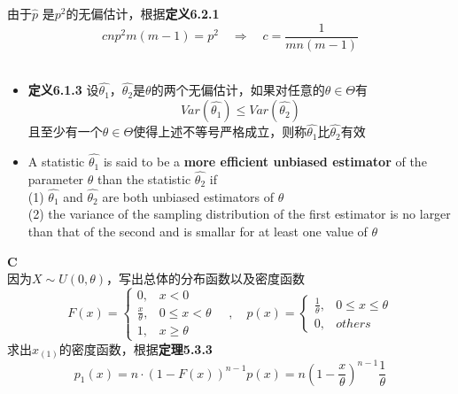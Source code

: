 \documentclass[a4paper]{ctexart}    %
\begin{document}
	由于$ \hat{p} $ 是$ p^2 $的无偏估计，根据\textbf{定义6.2.1}
	\begin{equation*}
		cnp^2m(m-1) = p^2 \quad \Rightarrow \quad c = \frac{1}{mn(m-1)}
	\end{equation*} \\
	\begin{tcolorbox}
		[
		colframe=blue!25,
		colback=blue!10,
		coltitle=blue!20!black,  
		fonttitle=\bfseries,
		adjusted title=Formula Or Theorem:
		]
		\begin{itemize}
			\item \textbf{定义6.1.3} 设$ \hat{\theta_1} $，$ \hat{\theta_2} $是$ \theta $的两个无偏估计，如果对任意的$ \theta \in \Theta$有
			\begin{equation*}
				Var(\hat{\theta_1}) \leq Var(\hat{\theta_2})
			\end{equation*}
			且至少有一个$ \theta \in \Theta $使得上述不等号严格成立，则称$ \hat{\theta_1} $比$ \hat{\theta_2} $有效
			\item A statistic $ \hat{\theta_1} $ is said to be a \textbf{more efficient unbiased estimator} of the parameter $ \theta $ than the statistic $ \hat{\theta_2} $ if \\
			(1) $ \hat{\theta_1} $ and $ \hat{\theta_2} $ are both unbiased estimators of $ \theta $ \\
			(2) the variance of the sampling distribution of the first estimator is no larger than that of the second and is smallar for at least one value of $ \theta $
		\end{itemize}
	\end{tcolorbox}
	 \quad \textbf{C} \\
	因为$ X \sim U(0, \theta) $，写出总体的分布函数以及密度函数
	\begin{equation*}
		F(x) = 
		\begin{cases}
			0, & x<0 \\
			\frac{x}{\theta} , & 0 \leq x < \theta \\
			1, & x \geq \theta
		\end{cases}
		\quad , \quad 
		p(x) = 
		\begin{cases}
			\frac{1}{\theta} , & 0 \leq x \leq \theta \\
			0 , & others
		\end{cases}
	\end{equation*}
	求出$ x_{(1)} $的密度函数，根据\textbf{定理5.3.3}
	\begin{equation*}
		p_1(x) = n\cdot (1-F(x))^{n-1}p(x) = n\left(1-\frac{x}{\theta}\right)^{n-1} \frac{1}{\theta}
	\end{equation*}
\end{document}
